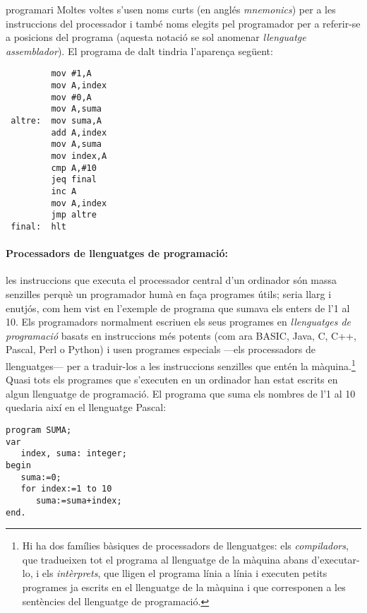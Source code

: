 \begin{persabermes}{programari}
Moltes voltes s'usen noms curts (en anglés \emph{mnemonics}) per a les
instruccions del processador i també noms elegits pel programador per
a referir-se a posicions del programa (aquesta notació se sol anomenar
\emph{llenguatge assemblador}). El programa de dalt tindria l'aparença
següent:
\begin{verbatim}
         mov #1,A
         mov A,index
         mov #0,A
         mov A,suma
 altre:  mov suma,A
         add A,index
         mov A,suma
         mov index,A
         cmp A,#10
         jeq final
         inc A
         mov A,index
         jmp altre
 final:  hlt
\end{verbatim}

\paragraph{Processadors de llenguatges de programació:} les
instruccions que executa el processador central d'un ordinador són
massa senzilles perquè un programador humà en faça programes útils;
seria llarg i enutjós, com hem vist en l'exemple de programa que
sumava els enters de l'1 al 10.  Els programadors normalment escriuen
els seus programes en {\em llenguatges de programació} basats en
instruccions més potents (com ara BASIC, Java, C, C++, Pascal, Perl o
Python) i usen programes especials ---els processadors de
llenguatges--- per a traduir-los a les instruccions senzilles que
entén la màquina.\footnote{Hi ha dos famílies bàsiques de processadors
  de llenguatges: els \emph{compiladors}, que tradueixen tot el
  programa al llenguatge de la màquina abans d'executar-lo, i els
  \emph{intèrprets}, que lligen el programa línia a línia i executen
  petits programes ja escrits en el llenguatge de la màquina i que
  corresponen a les sentències del llenguatge de programació.} Quasi
tots els programes que s'executen en un ordinador han estat escrits en
algun llenguatge de programació. El programa que suma els nombres de
l'1 al 10 quedaria així en el llenguatge Pascal:
\begin{verbatim}
program SUMA;
var
   index, suma: integer;
begin
   suma:=0;
   for index:=1 to 10
      suma:=suma+index;
end.
\end{verbatim}


\end{persabermes}
